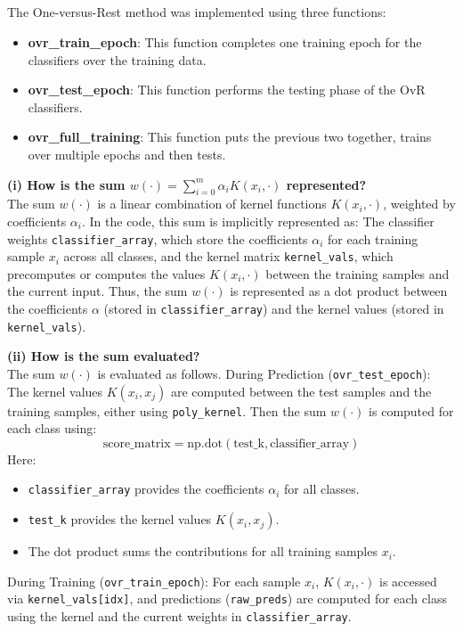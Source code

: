 \documentclass[final,3p,times,12pt]{article}
\begin{document}
\subsection{}

The One-versus-Rest method was implemented using three functions: 
\begin{itemize}
    \item \textbf{ovr\_train\_epoch}: This function completes one training epoch for the classifiers over the training data. 
    \item \textbf{ovr\_test\_epoch}: This function performs the testing phase of the OvR classifiers.
    \item \textbf{ovr\_full\_training}: This function puts the previous two together, trains over multiple epochs and then tests. 
\end{itemize}

\noindent \textbf{(i) How is the sum \( w(\cdot) = \sum_{i=0}^m \alpha_i K(x_i, \cdot) \) represented?} \\
The sum \( w(\cdot) \) is a linear combination of kernel functions \( K(x_i, \cdot) \), weighted by coefficients \( \alpha_i \). In the code, this sum is implicitly represented as: The classifier weights \texttt{classifier\_array}, which store the coefficients \( \alpha_i \) for each training sample \( x_i \) across all classes, and the kernel matrix \texttt{kernel\_vals}, which precomputes or computes the values \( K(x_i, \cdot) \) between the training samples and the current input. Thus, the sum \( w(\cdot) \) is represented as a dot product between the coefficients \( \alpha \) (stored in \texttt{classifier\_array}) and the kernel values (stored in \texttt{kernel\_vals}).

\vspace{0.5cm}

\noindent \textbf{(ii) How is the sum evaluated?} \\
The sum \( w(\cdot) \) is evaluated as follows. During Prediction (\texttt{ovr\_test\_epoch}): The kernel values \( K(x_i, x_j) \) are computed between the test samples and the training samples, either using \texttt{poly\_kernel}. Then the sum \( w(\cdot) \) is computed for each class using:
\[
\text{score\_matrix} = \text{np.dot}(\text{test\_k}, \text{classifier\_array})
\]
Here:
\begin{itemize}
    \item \texttt{classifier\_array} provides the coefficients \( \alpha_i \) for all classes.
    \item \texttt{test\_k} provides the kernel values \( K(x_i, x_j) \).
    \item The dot product sums the contributions for all training samples \( x_i \).
\end{itemize}
During Training (\texttt{ovr\_train\_epoch}): For each sample \( x_i \), \( K(x_i, \cdot) \) is accessed via \texttt{kernel\_vals[idx]}, and predictions (\texttt{raw\_preds}) are computed for each class using the kernel and the current weights in \texttt{classifier\_array}.
\end{document}
